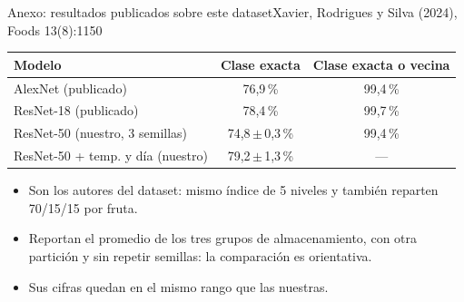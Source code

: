 \documentclass[aspectratio=169,11pt,table]{beamer}
\begin{document}
{
\begin{frame}[plain]
  \vfill
  \vfill
\end{frame}
}

\begin{frame}{Anexo: resultados publicados sobre este dataset}{Xavier, Rodrigues y Silva (2024), Foods 13(8):1150}
{\small
\centering
\begin{tabular}{lcc}
\toprule
\rowcolor{verdeosc}\color{white}\bfseries Modelo & \color{white}\bfseries Clase exacta & \color{white}\bfseries Clase exacta o vecina \\
\midrule
AlexNet (publicado) & 76{,}9\,\% & 99{,}4\,\% \\
ResNet-18 (publicado) & 78{,}4\,\% & 99{,}7\,\% \\
ResNet-50 (nuestro, 3 semillas) & 74{,}8\,$\pm$\,0{,}3\,\% & 99{,}4\,\% \\
ResNet-50 + temp. y día (nuestro) & 79{,}2\,$\pm$\,1{,}3\,\% & --- \\
\bottomrule
\end{tabular}
}
\vspace{0.6em}
{\small
\setlength{\itemsep}{0.3em}
\begin{itemize}
  \item Son los autores del dataset: mismo índice de 5 niveles y también reparten 70/15/15 por fruta.
  \item Reportan el promedio de los tres grupos de almacenamiento, con otra partición y sin repetir semillas: la comparación es orientativa.
  \item Sus cifras quedan en el mismo rango que las nuestras.
\end{itemize}
}
\end{frame}
\end{document}
